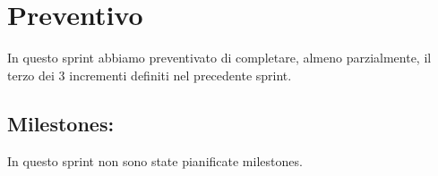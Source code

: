 \section{Preventivo}

In questo sprint abbiamo preventivato di completare, almeno parzialmente, il terzo dei 3 incrementi definiti nel precedente sprint.

\subsection{Milestones:}  

In questo sprint non sono state pianificate milestones.